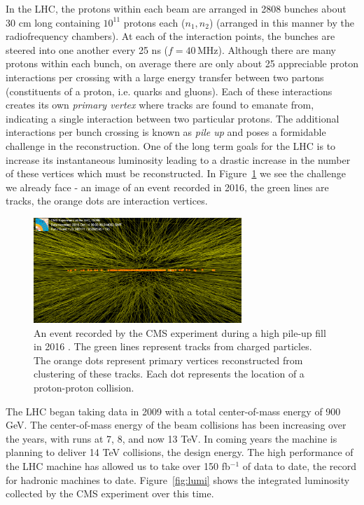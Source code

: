 In the LHC, the protons within each beam are arranged in 2808 bunches about 30 cm long containing $10^{11}$ protons each ($n_{1}, n_{2}$) (arranged in this manner by the radiofrequency chambers). At each of the interaction points, the bunches are steered into one another every 25 ns ($f=40\,\textrm{MHz}$). Although there are many protons within each bunch, on average there are only about 25 appreciable proton interactions per crossing with a large energy transfer between two partons (constituents of a proton, i.e. quarks and gluons). Each of these interactions creates its own \textit{primary vertex} where tracks are found to emanate from, indicating a single interaction between two particular protons. The additional interactions per bunch crossing is known as \textit{pile up} and poses a formidable challenge in the reconstruction. One of the long term goals for the LHC is to increase its instantaneous luminosity leading to a drastic increase in the number of these vertices which must be reconstructed. In Figure~\ref{fig:pu} we see  the challenge we already face - an image of an event recorded in 2016, the green lines are tracks, the orange dots are interaction vertices.

\begin{figure}
\centering
\includegraphics[width=0.7\textwidth]{figs/highpileup0_4.png}
\caption[An event recorded by the CMS experiment during a high pile-up fill in 2016.]{An event recorded by the CMS experiment during a high pile-up fill in 2016 \cite{pu}. The green lines represent tracks from charged particles. The orange dots represent primary vertices reconstructed from clustering of these tracks. Each dot represents the location of a proton-proton collision.}
\label{fig:pu}
\end{figure}

The LHC began taking data in 2009 with a total center-of-mass energy of 900 GeV. The center-of-mass energy of the beam collisions has been increasing over the years, with runs at 7, 8, and now 13 TeV. In coming years the machine is planning to deliver 14 TeV collisions, the design energy. The high performance of the LHC machine has allowed us to take over 150 fb$^{-1}$ of data to date, the record for hadronic machines to date. Figure~\ref{fig:lumi} shows the integrated luminosity collected by the CMS experiment over this time.

